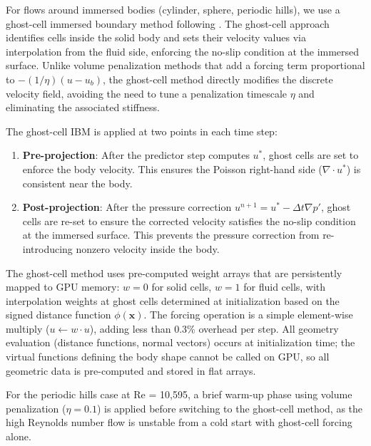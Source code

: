 For flows around immersed bodies (cylinder, sphere, periodic hills), we use a ghost-cell immersed boundary method following \citet{Fadlun2000}.
The ghost-cell approach identifies cells inside the solid body and sets their velocity values via interpolation from the fluid side, enforcing the no-slip condition at the immersed surface.
Unlike volume penalization methods that add a forcing term proportional to $-(1/\eta)(u - u_b)$, the ghost-cell method directly modifies the discrete velocity field, avoiding the need to tune a penalization timescale $\eta$ and eliminating the associated stiffness.

The ghost-cell IBM is applied at two points in each time step:
\begin{enumerate}
    \item \textbf{Pre-projection}: After the predictor step computes $u^*$, ghost cells are set to enforce the body velocity. This ensures the Poisson right-hand side ($\nabla \cdot u^*$) is consistent near the body.
    \item \textbf{Post-projection}: After the pressure correction $u^{n+1} = u^* - \Delta t \nabla p'$, ghost cells are re-set to ensure the corrected velocity satisfies the no-slip condition at the immersed surface. This prevents the pressure correction from re-introducing nonzero velocity inside the body.
\end{enumerate}

The ghost-cell method uses pre-computed weight arrays that are persistently mapped to GPU memory: $w = 0$ for solid cells, $w = 1$ for fluid cells, with interpolation weights at ghost cells determined at initialization based on the signed distance function $\phi(\mathbf{x})$.
The forcing operation is a simple element-wise multiply ($u \leftarrow w \cdot u$), adding less than 0.3\% overhead per step.
All geometry evaluation (distance functions, normal vectors) occurs at initialization time; the virtual functions defining the body shape cannot be called on GPU, so all geometric data is pre-computed and stored in flat arrays.

For the periodic hills case at Re = 10{,}595, a brief warm-up phase using volume penalization ($\eta = 0.1$) is applied before switching to the ghost-cell method, as the high Reynolds number flow is unstable from a cold start with ghost-cell forcing alone.
